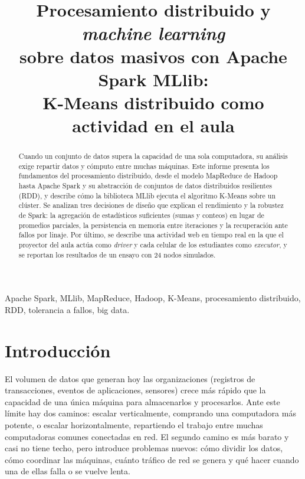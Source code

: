 \documentclass[conference,a4paper]{IEEEtran}
\begin{document}
\title{Procesamiento distribuido y \textit{machine learning}\\sobre datos masivos con Apache Spark MLlib:\\K-Means distribuido como actividad en el aula}

\author{
}

\maketitle

\begin{abstract}
Cuando un conjunto de datos supera la capacidad de una sola computadora, su análisis exige repartir datos y cómputo entre muchas máquinas. Este informe presenta los fundamentos del procesamiento distribuido, desde el modelo MapReduce de Hadoop hasta Apache Spark y su abstracción de conjuntos de datos distribuidos resilientes (RDD), y describe cómo la biblioteca MLlib ejecuta el algoritmo K-Means sobre un clúster. Se analizan tres decisiones de diseño que explican el rendimiento y la robustez de Spark: la agregación de estadísticos suficientes (sumas y conteos) en lugar de promedios parciales, la persistencia en memoria entre iteraciones y la recuperación ante fallos por linaje. Por último, se describe una actividad web en tiempo real en la que el proyector del aula actúa como \textit{driver} y cada celular de los estudiantes como \textit{executor}, y se reportan los resultados de un ensayo con 24 nodos simulados.
\end{abstract}

\begin{IEEEkeywords}
Apache Spark, MLlib, MapReduce, Hadoop, K-Means, procesamiento distribuido, RDD, tolerancia a fallos, big data.
\end{IEEEkeywords}

\section{Introducción}

El volumen de datos que generan hoy las organizaciones (registros de transacciones, eventos de aplicaciones, sensores) crece más rápido que la capacidad de una única máquina para almacenarlos y procesarlos. Ante este límite hay dos caminos: escalar verticalmente, comprando una computadora más potente, o escalar horizontalmente, repartiendo el trabajo entre muchas computadoras comunes conectadas en red. El segundo camino es más barato y casi no tiene techo, pero introduce problemas nuevos: cómo dividir los datos, cómo coordinar las máquinas, cuánto tráfico de red se genera y qué hacer cuando una de ellas falla o se vuelve lenta.
\end{document}
